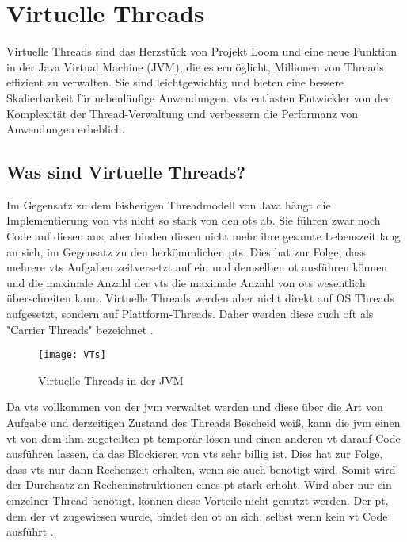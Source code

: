 \section{Virtuelle Threads}                                 %
\label{sec:VirtuelleThreads}

Virtuelle Threads sind das Herzstück von Projekt Loom und eine neue Funktion in der Java Virtual Machine (JVM), die es ermöglicht, Millionen von Threads effizient zu verwalten.
Sie sind leichtgewichtig und bieten eine bessere Skalierbarkeit für nebenläufige Anwendungen.
\Glspl{vt} entlasten Entwickler von der Komplexität der Thread-Verwaltung und verbessern die Performanz von Anwendungen erheblich.


\subsection{Was sind Virtuelle Threads?}
\label{subsec:WassindVTs?}

    Im Gegensatz zu dem bisherigen Threadmodell von Java hängt die Implementierung von \Glspl{vt} nicht so stark von den \Glspl{ot} ab. Sie führen zwar noch Code 
    auf diesen aus, aber binden diesen nicht mehr ihre gesamte Lebenszeit lang an sich, im Gegensatz zu den herkömmlichen \Glspl{pt}. Dies hat zur Folge, 
    dass mehrere \Glspl{vt} Aufgaben zeitversetzt auf ein und demselben \gls{ot} ausführen können und die maximale Anzahl der \Glspl{vt}
    die maximale Anzahl von \Glspl{ot} wesentlich überschreiten kann.
    Virtuelle Threads werden aber nicht direkt auf OS Threads aufgesetzt, sondern auf Plattform-Threads.
    Daher werden diese auch oft als "Carrier Threads" bezeichnet \cite{ieee2022}.
    

    \begin{figure}[H]
        \centering
        \texttt{[image: VTs]}
        \caption{Virtuelle Threads in der JVM}
        \label{fig:VTs}
    \end{figure}

    Da \Glspl{vt} vollkommen von der \gls{jvm} verwaltet werden und diese über die Art von Aufgabe und derzeitigen Zustand des Threads Bescheid weiß, kann die
    \gls{jvm} einen \gls{vt} von dem ihm zugeteilten \gls{pt} temporär lösen und einen anderen \gls{vt} darauf Code ausführen lassen, da das Blockieren von \Glspl{vt}
    sehr billig ist. Dies hat zur Folge, dass \Glspl{vt} nur dann Rechenzeit erhalten, wenn sie auch benötigt wird. Somit wird der Durchsatz an Recheninstruktionen
    eines \gls{pt} stark erhöht.
    Wird aber nur ein einzelner Thread benötigt, können diese Vorteile nicht genutzt werden. Der \gls{pt}, dem der \gls{vt} zugewiesen wurde, bindet den \gls{ot}
    an sich, selbst wenn kein \gls{vt} Code ausführt \cite{JEP444}.
    

